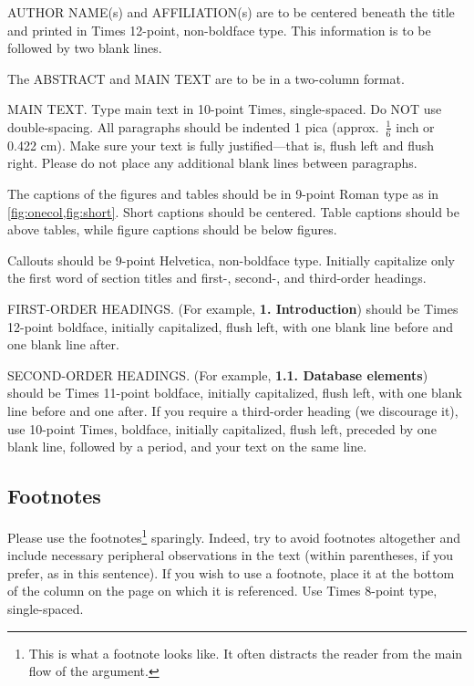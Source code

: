 AUTHOR NAME(s) and AFFILIATION(s) are to be centered beneath the title
and printed in Times 12-point, non-boldface type.
This information is to be followed by two blank lines.

The ABSTRACT and MAIN TEXT are to be in a two-column format.

MAIN TEXT.
Type main text in 10-point Times, single-spaced.
Do NOT use double-spacing.
All paragraphs should be indented 1 pica (approx.~$\frac{1}{6}$ inch or 0.422 cm).
Make sure your text is fully justified---that is, flush left and flush right.
Please do not place any additional blank lines between paragraphs.

The captions of the figures and tables should be in 9-point Roman type as in \cref{fig:onecol,fig:short}.
Short captions should be centered.  Table captions should be above tables, while figure captions should be below figures.

\noindent Callouts should be 9-point Helvetica, non-boldface type.
Initially capitalize only the first word of section titles and first-, second-, and third-order headings.

FIRST-ORDER HEADINGS.
(For example, {\large \bf 1. Introduction}) should be Times 12-point boldface, initially capitalized, flush left, with one blank line before and one blank line after.

SECOND-ORDER HEADINGS.
(For example, { \bf 1.1. Database elements}) should be Times 11-point boldface, initially capitalized, flush left, with one blank line before and one after.
If you require a third-order heading (we discourage it), use 10-point Times, boldface, initially capitalized, flush left, preceded by one blank line, followed by a period, and your text on the same line.

\subsection{Footnotes}

Please use the footnotes\footnote{This is what a footnote looks like.
It often distracts the reader from the main flow of the argument.} sparingly.
Indeed, try to avoid footnotes altogether and include necessary peripheral observations in the text (within parentheses, if you prefer, as in this sentence).
If you wish to use a footnote, place it at the bottom of the column on the page on which it is referenced.
Use Times 8-point type, single-spaced.


